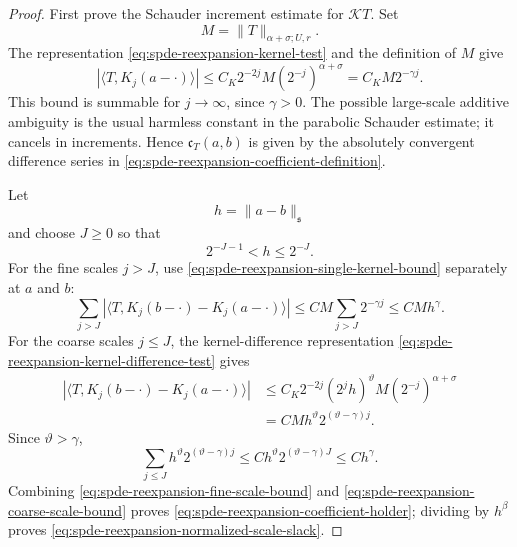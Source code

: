 \begin{proof}
First prove the Schauder increment estimate for
\(\mathcal KT\).  Set
\[
  M=\|T\|_{\alpha+\sigma;U,r}.
\]
The representation \eqref{eq:spde-reexpansion-kernel-test} and the
definition of \(M\) give
\begin{equation}
  |\langle T,K_j(a-\cdot)\rangle|
  \leq
  C_K2^{-2j}M(2^{-j})^{\alpha+\sigma}
  =
  C_KM2^{-\gamma j}.
  \label{eq:spde-reexpansion-single-kernel-bound}
\end{equation}
This bound is summable for \(j\to\infty\), since \(\gamma>0\).  The possible
large-scale additive ambiguity is the usual harmless constant in the
parabolic Schauder estimate; it cancels in increments.  Hence
\(\mathfrak c_T(a,b)\) is given by the absolutely convergent difference
series in
\eqref{eq:spde-reexpansion-coefficient-definition}.

Let
\[
  h=\|a-b\|_{\mathfrak s}
\]
and choose \(J\geq0\) so that
\[
  2^{-J-1}<h\leq2^{-J}.
\]
For the fine scales \(j>J\), use
\eqref{eq:spde-reexpansion-single-kernel-bound} separately at \(a\) and
\(b\):
\begin{equation}
  \sum_{j>J}
  |\langle T,K_j(b-\cdot)-K_j(a-\cdot)\rangle|
  \leq
  CM\sum_{j>J}2^{-\gamma j}
  \leq
  CMh^\gamma .
  \label{eq:spde-reexpansion-fine-scale-bound}
\end{equation}
For the coarse scales \(j\leq J\), the kernel-difference representation
\eqref{eq:spde-reexpansion-kernel-difference-test} gives
\[
\begin{aligned}
  |\langle T,K_j(b-\cdot)-K_j(a-\cdot)\rangle|
  &\leq
  C_K2^{-2j}(2^jh)^\vartheta M(2^{-j})^{\alpha+\sigma}     \\
  &=
  CMh^\vartheta 2^{(\vartheta-\gamma)j}.
\end{aligned}
\]
Since \(\vartheta>\gamma\),
\begin{equation}
  \sum_{j\leq J}
  h^\vartheta 2^{(\vartheta-\gamma)j}
  \leq
  Ch^\vartheta 2^{(\vartheta-\gamma)J}
  \leq
  Ch^\gamma .
  \label{eq:spde-reexpansion-coarse-scale-bound}
\end{equation}
Combining \eqref{eq:spde-reexpansion-fine-scale-bound} and
\eqref{eq:spde-reexpansion-coarse-scale-bound} proves
\eqref{eq:spde-reexpansion-coefficient-holder}; dividing by \(h^\beta\)
proves \eqref{eq:spde-reexpansion-normalized-scale-slack}.


\end{proof}
